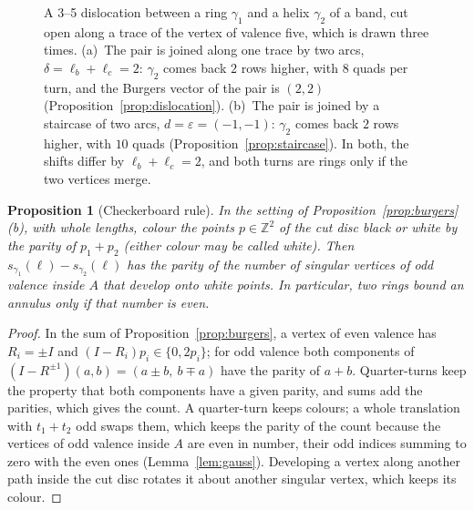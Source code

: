 \documentclass[11pt,a4paper]{article}
\newtheorem{proposition}{Proposition}
\newcommand{\Z}{\mathbb{Z}}
\newcommand{\shift}{s}
\newcommand{\lean}[1]{\texttt{\detokenize{#1}}}
\newenvironment{evidence}[3][]{}{}
\begin{document}
\begin{figure}[t]
\centering

\caption{A 3--5 dislocation between a ring $\gamma_1$ and a helix $\gamma_2$
of a band, cut open along a trace of the vertex of valence five, which is
drawn three times. (a)~The pair is joined along one trace by two arcs, $\delta
= \ell_b + \ell_c = 2$: $\gamma_2$ comes back $2$ rows higher, with $8$
quads per turn, and the Burgers vector of the pair is $(2, 2)$
(Proposition~\ref{prop:dislocation}). (b)~The pair is joined by a staircase of
two arcs, $d = \varepsilon = (-1, -1)$: $\gamma_2$ comes back $2$ rows higher,
with $10$ quads (Proposition~\ref{prop:staircase}). In both, the shifts differ
by $\ell_b + \ell_c = 2$, and both turns are rings only if the two vertices
merge.}
\label{fig:dislocation}
\end{figure}

\begin{evidence}{core}{\lean{checkerboard}, \lean{oddColours_translate}; tested: 1{,}960 annuli on the spheres of 50 random instances; assumed: the Burgers sum of the proposition above}
\begin{proposition}[Checkerboard rule]\label{prop:checkerboard}
In the setting of Proposition~\ref{prop:burgers}(b), with whole lengths,
colour the points $p \in \Z^2$ of the cut disc black or white by the parity of
$p_1 + p_2$ (either colour may be called white). Then $\shift_{\gamma_1}(\ell)
- \shift_{\gamma_2}(\ell)$ has the parity of the number of singular vertices
of odd valence inside $A$ that develop onto white points. In particular, two
rings bound an annulus only if that number is even.
\end{proposition}
\end{evidence}

\begin{proof}
In the sum of Proposition~\ref{prop:burgers}, a vertex of even valence has
$R_i = \pm I$ and $(I - R_i)p_i \in \{0, 2p_i\}$; for odd valence both
components of $(I - R^{\pm1})(a, b) = (a \pm b,\ b \mp a)$ have the parity of
$a + b$. Quarter-turns keep the property that both components have a given
parity, and sums add the parities, which gives the count. A quarter-turn keeps
colours; a whole translation with $t_1 + t_2$ odd swaps them, which keeps the
parity of the count because the vertices of odd valence inside $A$ are even in
number, their odd indices summing to zero with the even ones
(Lemma~\ref{lem:gauss}). Developing a vertex along another path inside the cut
disc rotates it about another singular vertex, which keeps its colour.
\end{proof}
\end{document}
